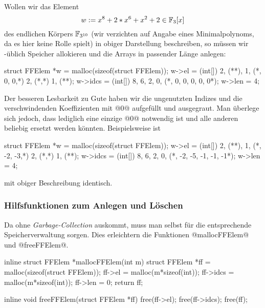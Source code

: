 \begin{beispiel}
  Wollen wir das Element 
  \[ w := x^8 + 2*x^6 + x^2 + 2 \in \mathbb{F}_3[x]\]
  des endlichen Körpers $\mathbb{F}_{3^{10}}$ 
  (wir verzichten auf Angabe eines Minimalpolynoms, da es hier keine
  Rolle spielt) in obiger Darstellung beschreiben, so müssen wir \Clang-üblich
  Speicher allokieren und die Arrays in passender Länge anlegen:
  \begin{cexample}
    struct FFElem *w = malloc(sizeof(struct FFElem));
    w->el = (int[]) {2, (**), 1, (*, 0, 0,*) 2, (*,*) 1, (**)};
    w->idcs = (int[]) {8, 6, 2, 0, (*, 0, 0, 0, 0, 0*)};
    w->len = 4;
  \end{cexample}
  Der besseren Lesbarkeit zu Gute haben wir die ungenutzten Indizes und die 
  verschwindenden Koeffizienten mit @0@ aufgefüllt und ausgegraut. 
  Man überlege sich jedoch,
  dass lediglich eine einzige @0@ notwendig ist und alle anderen 
  beliebig ersetzt werden könnten. Beispielsweise ist
  \begin{cexample}
    struct FFElem *w = malloc(sizeof(struct FFElem));
    w->el = (int[]) {2, (**), 1, (*, -2, -3,*) 2, (*,*) 1, (**)};
    w->idcs = (int[]) {8, 6, 2, 0, (*, -2, -5, -1, -1, -1*)};
    w->len = 4;
  \end{cexample}
  mit obiger Beschreibung identisch.
\end{beispiel}


\subsubsection{Hilfsfunktionen zum Anlegen und Löschen}

Da \Clang ohne \emph{Garbage-Collection} auskommt, muss man selbst für die
entsprechende Speicherverwaltung sorgen. Dies erleichtern die Funktionen
@mallocFFElem@ und @freeFFElem@.

\begin{ccode}[caption={Aus \url{../Sage/enumeratePCNs.c}},
  firstnumber=30]
inline struct FFElem *mallocFFElem(int m){
    struct FFElem *ff = malloc(sizeof(struct FFElem));
    ff->el = malloc(m*sizeof(int));
    ff->idcs = malloc(m*sizeof(int));
    ff->len = 0;
    return ff;
}
\end{ccode}

\begin{ccode}[caption={Aus \url{../Sage/enumeratePCNs.c}},
  firstnumber=37]
inline void freeFFElem(struct FFElem *ff){
    free(ff->el);
    free(ff->idcs);
    free(ff);
}
\end{ccode}

